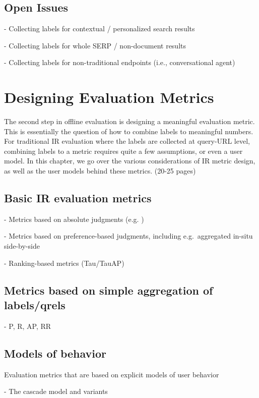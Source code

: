 \documentclass[openany]{now} %
\begin{document}
\section{Open Issues}

- Collecting labels for contextual / personalized search results

- Collecting labels for whole SERP / non-document results

- Collecting labels for non-traditional endpoints (i.e., conversational agent)

\chapter{Designing Evaluation Metrics}
\label{c-metrics}

The second step in offline evaluation is designing a meaningful evaluation metric. This is essentially the question of how to combine labels to meaningful numbers. For traditional IR evaluation where the labels are collected at query-URL level, combining labels to a metric requires quite a few assumptions, or even a user model. In this chapter, we go over the various considerations of IR metric design, as well as the user models behind these metrics. (20-25 pages)

\section{Basic IR evaluation metrics}

- Metrics based on absolute judgments (e.g. \cite{cooper73selecting})

- Metrics based on preference-based judgments, including e.g.\ aggregated in-situ side-by-side \cite{Thomas2006}

- Ranking-based metrics (Tau/TauAP)

\section{Metrics based on simple aggregation of labels/qrels}

- P, R, AP, RR

\section{Models of behavior}

Evaluation metrics that are based on explicit models of user behavior

- The cascade model and variants
\end{document}
